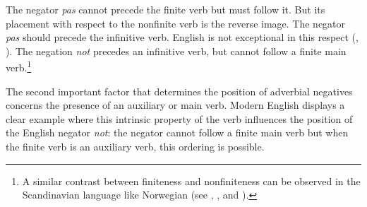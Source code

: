 \documentclass[output=paper]{langsci/langscibook}
\begin{document}
{\eal{}
\zl

\noindent
The negator {\it pas} cannot precede the finite verb
but must follow it. But its placement with respect to
the nonfinite verb is the reverse image. The negator {\it pas}
should precede the infinitive verb.
English is not exceptional in this respect (\citet{Baker:89,Baker:91}, \citet{Ernst:92}).
The negation {\it not} precedes an infinitive verb, but cannot follow
a finite main verb.\footnote{A similar contrast between finiteness and
nonfiniteness can be observed in the Scandinavian language like Norwegian (see \citet{Platzack:86}, \citet{HP:88}, and \citet{Vikner:94,Vikner:97}).}

\eal{}
\zl

\begin{exe}
\ex\label{eng-fin-neg} \begin{xlist}
\zl

\pfix
\pfix\pfix

\begin{exe}
\ex\label{fr-fin-neg} \begin{xlist}
\zl



%
%
%
%
%

The second important factor that determines the position of adverbial
negatives concerns the presence of an auxiliary or main verb.
Modern English displays a clear example where this
intrinsic property of the verb influences the position of
the English negator {\it not}: the negator cannot follow
a finite main verb but when the finite verb is an auxiliary verb,
this ordering is possible.


\end{xlist}
\end{exe}
\end{xlist}
\end{exe}}
\end{document}
